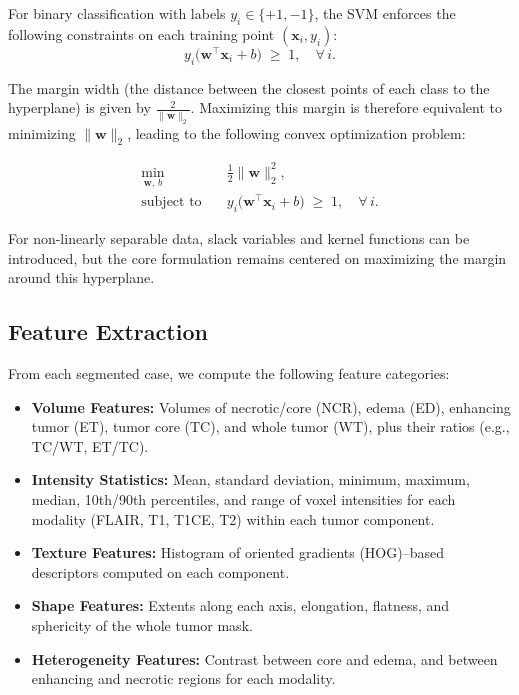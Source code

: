 For binary classification with labels $y_i \in \{+1, -1\}$, the SVM enforces the following constraints on each training point $(\mathbf{x}_i, y_i)$:
\begin{equation}
  y_i \bigl(\mathbf{w}^\top \mathbf{x}_i + b\bigr) \;\ge\; 1,
  \quad \forall\,i.
\end{equation}

The margin width (the distance between the closest points of each class to the hyperplane) is given by $\tfrac{2}{\|\mathbf{w}\|_2}$.  Maximizing this margin is therefore equivalent to minimizing $\|\mathbf{w}\|_2$, leading to the following convex optimization problem:

\begin{align}
  \min_{\mathbf{w},\,b} \quad & \frac{1}{2} \|\mathbf{w}\|_2^2,                             \\
  \text{subject to} \quad     & y_i \bigl(\mathbf{w}^\top \mathbf{x}_i + b\bigr) \;\ge\; 1,
  \quad \forall\,i.
\end{align}

For non-linearly separable data, slack variables and kernel functions can be introduced, but the core formulation remains centered on maximizing the margin around this hyperplane.

\subsection{Feature Extraction}
From each segmented case, we compute the following feature categories:
\begin{itemize}
  \item \textbf{Volume Features:} Volumes of necrotic/core (NCR), edema (ED), enhancing tumor (ET), tumor core (TC), and whole tumor (WT), plus their ratios (e.g., TC/WT, ET/TC).
  \item \textbf{Intensity Statistics:} Mean, standard deviation, minimum, maximum, median, 10th/90th percentiles, and range of voxel intensities for each modality (FLAIR, T1, T1CE, T2) within each tumor component.
  \item \textbf{Texture Features:} Histogram of oriented gradients (HOG)–based descriptors computed on each component.
  \item \textbf{Shape Features:} Extents along each axis, elongation, flatness, and sphericity of the whole tumor mask.
  \item \textbf{Heterogeneity Features:} Contrast between core and edema, and between enhancing and necrotic regions for each modality.
\end{itemize}

